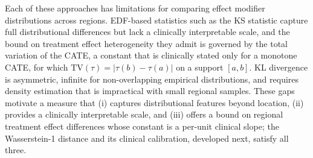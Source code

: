 \documentclass[AMA,Times1COL]{WileyNJDv5}
\begin{document}
Each of these approaches has limitations for comparing effect modifier distributions across regions. EDF-based statistics such as the KS statistic capture full distributional differences but lack a clinically interpretable scale, and the bound on treatment effect heterogeneity they admit is governed by the total variation of the CATE, a constant that is clinically stated only for a monotone CATE, for which $\mathrm{TV}(\tau) = |\tau(b) - \tau(a)|$ on a support $[a, b]$. KL divergence is asymmetric, infinite for non-overlapping empirical distributions, and requires density estimation that is impractical with small regional samples. These gaps motivate a measure that (i) captures distributional features beyond location, (ii) provides a clinically interpretable scale, and (iii) offers a bound on regional treatment effect differences whose constant is a per-unit clinical slope; the Wasserstein-1 distance and its clinical calibration, developed next, satisfy all three.
\end{document}
